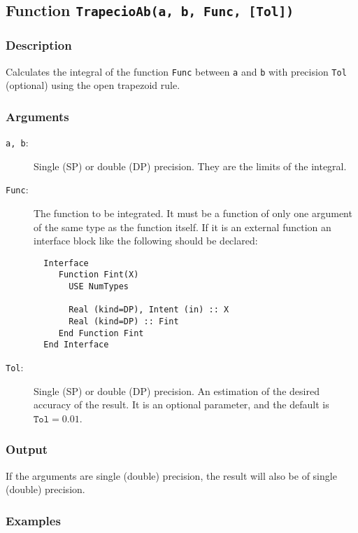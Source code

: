 \subsection{Function \texttt{TrapecioAb(a, b, Func, [Tol])}}

\subsubsection{Description}

Calculates the integral of the function \texttt{Func} between
\texttt{a} and \texttt{b} with precision \texttt{Tol} (optional) using
the open trapezoid rule.


\subsubsection{Arguments}

\begin{description}
\item[\texttt{a, b}:] Single (SP) or double (DP) precision. They are
  the limits of the integral.
\item[\texttt{Func}:] The function to be integrated. It must be a
  function of only one argument of the same type as the function
  itself. If it is an
  external function an interface block like the following should be
  declared: 
\begin{verbatim}
  Interface 
     Function Fint(X)
       USE NumTypes

       Real (kind=DP), Intent (in) :: X
       Real (kind=DP) :: Fint
     End Function Fint
  End Interface
\end{verbatim}
\item[\texttt{Tol}:] Single (SP) or double (DP) precision. An
  estimation of the desired accuracy of the result. It is an optional
  parameter, and the default is $\mathtt{Tol} = 0.01$. 
\end{description}


\subsubsection{Output}

If the arguments are single (double) precision, the result will also be of
single (double) precision. 



\subsubsection{Examples}


